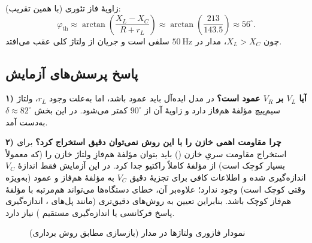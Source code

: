 \documentclass[a4paper,11pt]{article}
\begin{document}
زاویهٔ فاز تئوری (با همین تقریب):
\[
\varphi_{\text{th}}\approx \arctan\!\left(\frac{X_L-X_C}{R+r_L}\right)\approx
\arctan\!\left(\frac{213}{143.5}\right)\approx 56^\circ.
\]
چون $X_L>X_C$، مدار در $50~\mathrm{Hz}$ سلفی است و جریان از ولتاژ کلی عقب می‌افتد.

\subsection{پاسخ پرسش‌های آزمایش}
\textbf{۱) آیا $V_L$ بر $V_R$ عمود است؟}
در مدل ایده‌آل باید عمود باشد، اما به‌علت وجود $r_L$، ولتاژ سیم‌پیچ مؤلفهٔ هم‌فاز دارد و زاویهٔ آن از $90^\circ$ کمتر می‌شود. در این بخش $\delta\approx 82^\circ$ به‌دست آمد.

\textbf{۲) چرا مقاومت اهمی خازن را با این روش نمی‌توان دقیق استخراج کرد؟}
برای استخراج مقاومت سریِ خازن () باید بتوان مؤلفهٔ هم‌فازِ ولتاژ خازن را (که معمولاً بسیار کوچک است) از مؤلفهٔ کاملاً راکتیو جدا کرد. در این آزمایش فقط اندازهٔ $V_C$ اندازه‌گیری شده و اطلاعات کافی برای تجزیهٔ دقیق $V_C$ به مؤلفهٔ هم‌فاز و عمود (به‌ویژه وقتی  کوچک است) وجود ندارد؛ علاوه‌بر آن، خطای دستگاه‌ها می‌تواند هم‌مرتبه با مؤلفهٔ هم‌فاز کوچک باشد. بنابراین تعیین  به روش‌های دقیق‌تری (مانند پل‌های ، اندازه‌گیری پاسخ فرکانسی یا اندازه‌گیری مستقیم ) نیاز دارد.

\begin{figure}[h!]
\caption{نمودار فازوری ولتاژها در مدار  (بازسازی مطابق روش برداری)}
\label{fig:phasorRLC}
\centering
\def\sc{0.7}
\end{figure}

\end{document}
